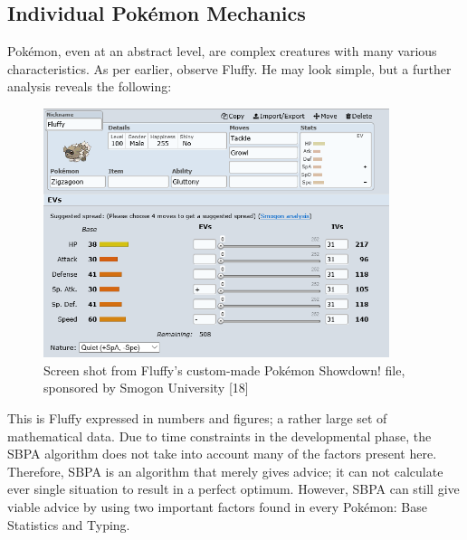 \documentclass{article}
\begin{document}
\subsection{Individual Pok\'emon Mechanics}
Pok\'emon, even at an abstract level, are complex creatures with many various characteristics. As per earlier, observe Fluffy. He may look simple, but a further analysis reveals the following:
\begin{figure}[H]
	\includegraphics[width=0.9\textwidth]{fluffyfile.png}
	\centering
	\caption{Screen shot from Fluffy's custom-made Pok\'emon Showdown! file, sponsored by Smogon University [18]}\label{FluffyFile}
\end{figure}
This is Fluffy expressed in numbers and figures; a rather large set of mathematical data. Due to time constraints in the developmental phase, the SBPA algorithm does not take into account many of the factors present here. Therefore, SBPA is an algorithm that merely gives advice; it can not calculate ever single situation to result in a perfect optimum. However, SBPA can still give viable advice by using two important factors found in every Pok\'emon: Base Statistics and Typing.
\end{document}
